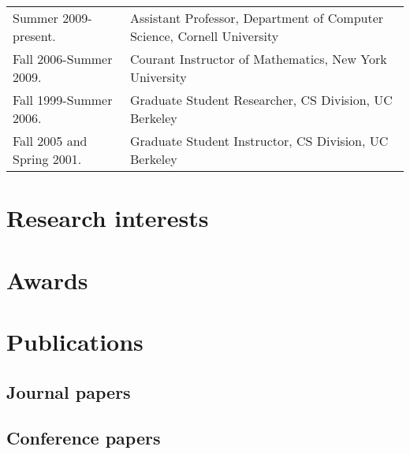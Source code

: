\documentclass{article}
\newenvironment{icompact}{
  \begin{list}{$\bullet$}{
    \parsep 0pt plus 1pt
    \partopsep 0pt plus 1pt
    \topsep 2pt plus 2pt minus 1pt
    \itemsep 0pt plus 1pt
    \parskip 0pt plus 2pt
    \leftmargin 0.3in}
       \raggedright}
  {\normalsize\end{list}}
\begin{document}
\begin{tabular}{ll}
  Summer 2009-present.
    & Assistant Professor, Department of Computer Science,
      Cornell University \\
  Fall 2006-Summer 2009.
    & Courant Instructor of Mathematics, New York University \\
  Fall 1999-Summer 2006.
    & Graduate Student Researcher, CS Division, UC Berkeley \\
  Fall 2005 and Spring 2001.
    & Graduate Student Instructor, CS Division, UC Berkeley
\end{tabular}


\section*{Research interests}


\section*{Awards}




\section*{Publications}

\subsection*{Journal papers}



\subsection*{Conference papers}
\end{document}
